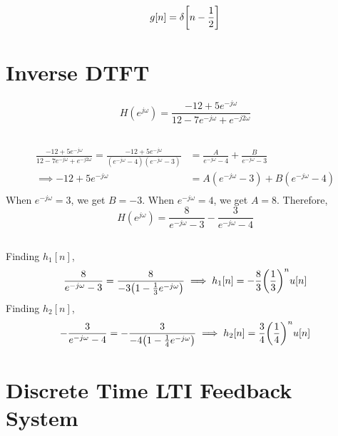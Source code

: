 \documentclass{article}
\begin{document}
\begin{equation}
    g[n] = \delta\qty[n - \frac{1}{2}]
\end{equation}

\section{Inverse DTFT}

\begin{equation}
    H(e^{j \omega}) = \frac{-12 + 5e^{-j \omega}}{12 - 7e^{-j \omega} + e^{-j 2\omega}}
\end{equation}

\subsection{}

\begin{align}
    \frac{-12 + 5e^{-j \omega}}{12 - 7e^{-j \omega} + e^{-j 2\omega}} = \frac{-12 + 5e^{-j \omega}}{(e^{-j \omega} - 4) (e^{-j \omega} - 3)} &= \frac{A}{e^{-j \omega} - 4} + \frac{B}{e^{-j \omega} - 3} \\
    \implies -12 + 5e^{-j \omega} &= A (e^{-j \omega} - 3) + B (e^{-j \omega} - 4) \\
\end{align}
When \(e^{-j \omega} = 3\), we get \(B = -3\).
When \(e^{-j \omega} = 4\), we get \(A = 8\).
Therefore,
\begin{equation}
    H(e^{j \omega}) = \frac{8}{e^{-j \omega} - 3} - \frac{3}{e^{-j \omega} - 4}
\end{equation}

\subsection{}

Finding \(h_1[n]\),
\begin{equation}
    \frac{8}{e^{-j \omega} - 3} = \frac{8}{-3 \qty(1 - \frac{1}{3} e^{-j \omega})} \implies h_1[n] = -\frac{8}{3} \qty(\frac{1}{3})^n u[n]
\end{equation}
Finding \(h_2[n]\),
\begin{equation}
    -\frac{3}{e^{-j \omega} - 4} = -\frac{3}{-4 \qty(1 - \frac{1}{4} e^{-j \omega})} \implies h_2[n] = \frac{3}{4} \qty(\frac{1}{4})^n u[n]
\end{equation}

\section{Discrete Time LTI Feedback System}
\end{document}
